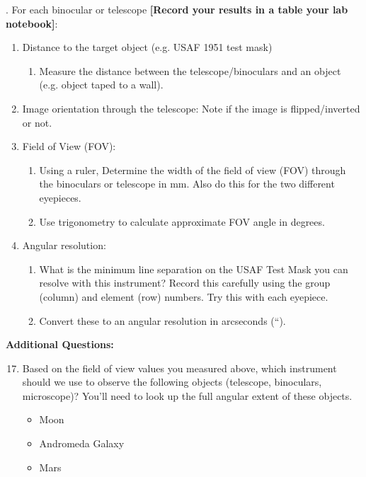 \documentclass[11pt]{article}
\begin{document}
\medskip {}. For each binocular or telescope \textbf{[Record your results in a table your lab notebook]}:
\begin{enumerate}
    \item[A.] Distance to the target object (e.g. USAF 1951 test mask)
    \begin{enumerate}
    \item[-] Measure the distance between the telescope/binoculars and an object (e.g. object taped to a wall).
    \end{enumerate}
    \item[B.] Image orientation through the telescope: Note if the image is flipped/inverted or not.

    \item[C.] Field of View (FOV):
    \begin{enumerate}
    \item[-] Using a ruler, Determine the width of the field of view (FOV) through the binoculars or telescope in mm. Also do this for the two different eyepieces.
    \item[-] Use trigonometry to calculate approximate FOV angle in degrees.
    \end{enumerate}
    \item[D.] Angular resolution:
    \begin{enumerate}
    \item[-] What is the minimum line separation on the USAF Test Mask you can resolve with this instrument? Record this carefully using the group (column) and element (row) numbers. Try this with each eyepiece.
    \item[-] Convert these to an angular resolution in arcseconds (“).
    \end{enumerate}

\end{enumerate}

\pagebreak \noindent
\textbf{Additional Questions:}
\begin{enumerate}
\setcounter{enumi}{16}
    \item Based on the field of view values you measured above, which instrument should we use to observe the following objects (telescope, binoculars, microscope)? You’ll need to look up the full angular extent of these objects.
    \begin{itemize}
        \item Moon
        \item Andromeda Galaxy
        \item Mars
    \end{itemize}
\end{enumerate}
\end{document}
